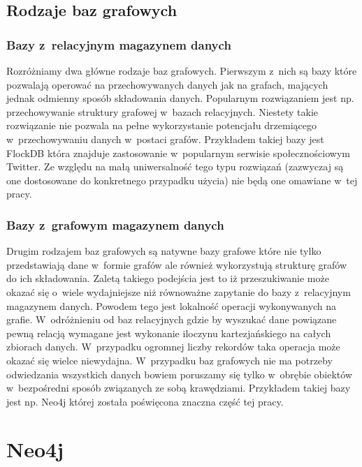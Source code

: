 \documentclass[brudnopis]{xmgr}
\begin{document}
\section{Rodzaje baz grafowych}

\subsection{Bazy z~relacyjnym magazynem danych}

Rozróżniamy dwa główne rodzaje baz grafowych. Pierwszym z~nich są bazy które pozwalają operować na przechowywanych danych jak na grafach, mających jednak odmienny sposób składowania danych. Popularnym rozwiązaniem jest np. przechowywanie struktury grafowej w~bazach relacyjnych. Niestety takie rozwiązanie nie pozwala na pełne wykorzystanie potencjału drzemiącego w~przechowywaniu danych w~postaci grafów. Przykładem takiej bazy jest FlockDB\cite{flockdb} która znajduje zastosowanie w~popularnym serwisie społecznościowym Twitter. Ze względu na małą uniwersalność tego typu rozwiązań (zazwyczaj są one dostosowane do konkretnego przypadku użycia) nie będą one omawiane w~tej pracy.

\subsection{Bazy z~grafowym magazynem danych}
Drugim rodzajem baz grafowych są natywne bazy grafowe które nie tylko przedstawiają dane w~formie grafów ale również wykorzystują strukturę grafów do ich składowania. Zaletą takiego podejścia jest to iż przeszukiwanie może okazać się o~wiele wydajniejsze niż równoważne zapytanie do bazy z~relacyjnym magazynem danych. Powodem tego jest lokalność operacji wykonywanych na grafie. W~odróżnieniu od baz relacyjnych gdzie by wyszukać dane powiązane pewną relacją wymagane jest wykonanie iloczynu kartezjańskiego na całych zbiorach danych. W~przypadku ogromnej liczby rekordów taka operacja może okazać się wielce niewydajna. W~przypadku baz grafowych nie ma potrzeby odwiedzania wszystkich danych bowiem poruszamy się tylko w~obrębie obiektów w~bezpośredni sposób związanych ze sobą krawędziami. Przykładem takiej bazy jest np. Neo4j której została poświęcona znaczna część tej pracy.

\chapter{Neo4j}
\end{document}
